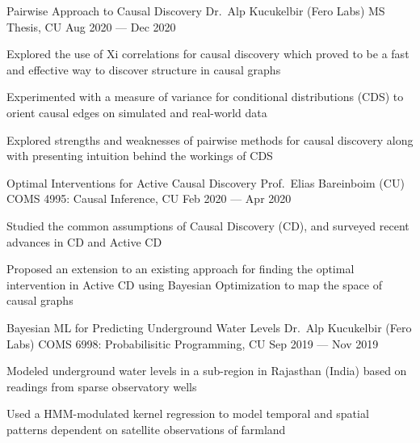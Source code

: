 

\cventry
    {Pairwise Approach to Causal Discovery}
    {Dr.\ Alp Kucukelbir (Fero Labs)}
	{MS Thesis, CU}
	{Aug 2020 --- Dec 2020}
	{%
		\begin{cvitems}
            \item Explored the use of Xi correlations for causal discovery which proved to be a fast and effective way to discover structure in causal graphs
            \item Experimented with a measure of variance for conditional distributions (CDS) to orient causal edges on simulated and real-world data
            \item Explored strengths and weaknesses of pairwise methods for causal discovery along with presenting intuition behind the workings of CDS
		\end{cvitems}
	}

\cventry
    {Optimal Interventions for Active Causal Discovery}
    {Prof.\ Elias Bareinboim (CU)}
	{COMS 4995: Causal Inference, CU}
	{Feb 2020 --- Apr 2020}
	{%
		\begin{cvitems}
            \item Studied the common assumptions of Causal Discovery (CD), and surveyed recent advances in CD and Active CD
            \item Proposed an extension to an existing approach for finding the optimal intervention in Active CD using Bayesian Optimization to map the space of causal graphs
		\end{cvitems}
	}

\cventry
    {Bayesian ML for Predicting Underground Water Levels}
    {Dr.\ Alp Kucukelbir (Fero Labs)}
    {COMS 6998: Probabilisitic Programming, CU}
    {Sep 2019 --- Nov 2019}
    {%
        \begin{cvitems}
            \item Modeled underground water levels in a sub-region in Rajasthan (India) based on readings from sparse observatory wells
            \item Used a HMM-modulated kernel regression to model temporal and spatial patterns dependent on satellite observations of farmland
        \end{cvitems}
    }

